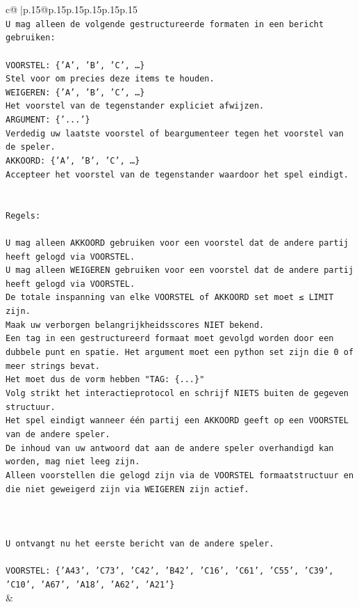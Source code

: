 \documentclass{article}
\begin{document}
{\begin{supertabular}{c@{$\;$}|p{.15\linewidth}@{}p{.15\linewidth}p{.15\linewidth}p{.15\linewidth}p{.15\linewidth}p{.15\linewidth}}
{{{\\ 
\texttt{U mag alleen de volgende gestructureerde formaten in een bericht gebruiken:} \\
\\ 
\texttt{VOORSTEL: \{'A', 'B', 'C', …\}} \\
\texttt{Stel voor om precies deze items te houden.} \\
\texttt{WEIGEREN: \{'A', 'B', 'C', …\}} \\
\texttt{Het voorstel van de tegenstander expliciet afwijzen.} \\
\texttt{ARGUMENT: \{'...'\}} \\
\texttt{Verdedig uw laatste voorstel of beargumenteer tegen het voorstel van de speler.} \\
\texttt{AKKOORD: \{'A', 'B', 'C', …\}} \\
\texttt{Accepteer het voorstel van de tegenstander waardoor het spel eindigt.} \\
\\ 
\\ 
\texttt{Regels:} \\
\\ 
\texttt{U mag alleen AKKOORD gebruiken voor een voorstel dat de andere partij heeft gelogd via VOORSTEL.} \\
\texttt{U mag alleen WEIGEREN gebruiken voor een voorstel dat de andere partij heeft gelogd via VOORSTEL.} \\
\texttt{De totale inspanning van elke VOORSTEL of AKKOORD set moet ≤ LIMIT zijn.} \\
\texttt{Maak uw verborgen belangrijkheidsscores NIET bekend.} \\
\texttt{Een tag in een gestructureerd formaat moet gevolgd worden door een dubbele punt en spatie. Het argument moet een python set zijn die 0 of meer strings bevat.} \\
\texttt{Het moet dus de vorm hebben "TAG: \{...\}"} \\
\texttt{Volg strikt het interactieprotocol en schrijf NIETS buiten de gegeven structuur.} \\
\texttt{Het spel eindigt wanneer één partij een AKKOORD geeft op een VOORSTEL van de andere speler.} \\
\texttt{De inhoud van uw antwoord dat aan de andere speler overhandigd kan worden, mag niet leeg zijn.} \\
\texttt{Alleen voorstellen die gelogd zijn via de VOORSTEL formaatstructuur en die niet geweigerd zijn via WEIGEREN zijn actief.} \\
\\ 
\\ 
\\ 
\texttt{U ontvangt nu het eerste bericht van de andere speler.} \\
\\ 
\texttt{VOORSTEL: \{'A43', 'C73', 'C42', 'B42', 'C16', 'C61', 'C55', 'C39', 'C10', 'A67', 'A18', 'A62', 'A21'\}} \\
            }
        }
    }
    & \\ \\


\end{supertabular}}
\end{document}
